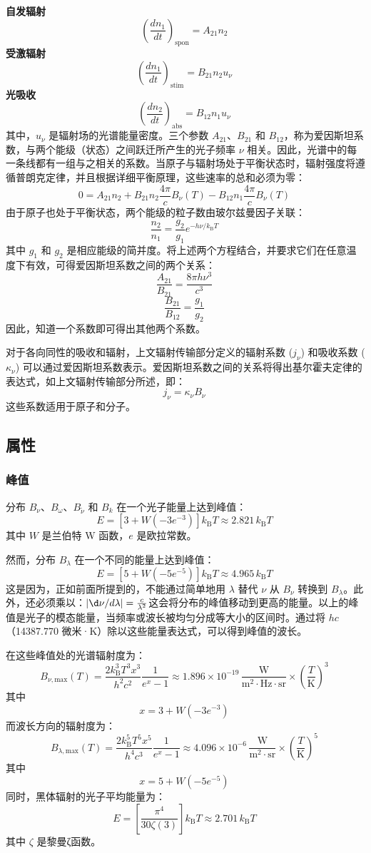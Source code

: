 \textbf{自发辐射}
\[
\left(\frac{dn_1}{dt}\right)_{\mathrm{spon}} = A_{21} n_2~
\]
\textbf{受激辐射}
\[
\left(\frac{dn_1}{dt}\right)_{\mathrm{stim}} = B_{21} n_2 u_\nu~
\]
\textbf{光吸收} 
\[
\left(\frac{dn_2}{dt}\right)_{\mathrm{abs}} = B_{12} n_1 u_\nu~
\]
其中，\( u_\nu \) 是辐射场的光谱能量密度。三个参数 \( A_{21} \)、\( B_{21} \) 和 \( B_{12} \)，称为爱因斯坦系数，与两个能级（状态）之间跃迁所产生的光子频率 \( \nu \) 相关。因此，光谱中的每一条线都有一组与之相关的系数。当原子与辐射场处于平衡状态时，辐射强度将遵循普朗克定律，并且根据详细平衡原理，这些速率的总和必须为零：
\[
0 = A_{21} n_2 + B_{21} n_2 \frac{4\pi}{c} B_\nu(T) - B_{12} n_1 \frac{4\pi}{c} B_\nu(T)~
\]
由于原子也处于平衡状态，两个能级的粒子数由玻尔兹曼因子关联：
\[
\frac{n_2}{n_1} = \frac{g_2}{g_1} e^{-h\nu / k_{\mathrm{B}} T}~
\]
其中 \( g_1 \) 和 \( g_2 \) 是相应能级的简并度。将上述两个方程结合，并要求它们在任意温度下有效，可得爱因斯坦系数之间的两个关系：
\[
\frac{A_{21}}{B_{21}} = \frac{8\pi h\nu^3}{c^3}~
\]
\[
\frac{B_{21}}{B_{12}} = \frac{g_1}{g_2}~
\]
因此，知道一个系数即可得出其他两个系数。

对于各向同性的吸收和辐射，上文辐射传输部分定义的辐射系数 (\( j_\nu \)) 和吸收系数 (\( \kappa_\nu \)) 可以通过爱因斯坦系数表示。爱因斯坦系数之间的关系将得出基尔霍夫定律的表达式，如上文辐射传输部分所述，即：
\[
j_\nu = \kappa_\nu B_\nu~
\]
这些系数适用于原子和分子。
\subsection{属性}
\subsubsection{峰值}
分布 \( B_\nu \)、\( B_\omega \)、\( B_{\tilde{\nu}} \) 和 \( B_k \) 在一个光子能量上达到峰值：
\[
E = \left[ 3 + W \left( -3e^{-3} \right) \right] k_{\mathrm{B}} T \approx 2.821 \, k_{\mathrm{B}} T~
\]
其中 \( W \) 是兰伯特 W 函数，\( e \) 是欧拉常数。

然而，分布 \( B_\lambda \) 在一个不同的能量上达到峰值：
\[
E = \left[ 5 + W \left( -5e^{-5} \right) \right] k_{\mathrm{B}} T \approx 4.965 \, k_{\mathrm{B}} T~
\]
这是因为，正如前面所提到的，不能通过简单地用 \( \lambda \) 替代 \( \nu \) 从 \( B_\nu \) 转换到 \( B_\lambda \)。此外，还必须乘以：\(| \d\nu/d\lambda| = \frac{c}{\lambda^2}\)这会将分布的峰值移动到更高的能量。以上的峰值是光子的模态能量，当频率或波长被均匀分成等大小的区间时。通过将 \( hc \)（14387.770 微米·K）除以这些能量表达式，可以得到峰值的波长。

在这些峰值处的光谱辐射度为：
\[
B_{\nu, {\text{max}}}(T) = \frac{2 k_{\mathrm{B}}^3 T^3 x^3}{h^2 c^2} \frac{1}{e^x - 1} \approx 1.896 \times 10^{-19} \, \frac{\text{W}}{\text{m}^2 \cdot \text{Hz} \cdot \text{sr}} \times \left( \frac{T}{\text{K}} \right)^3~
\]
其中
\[
x = 3 + W \left( -3e^{-3} \right)~
\]
而波长方向的辐射度为：
\[
B_{\lambda, {\text{max}}}(T) = \frac{2 k_{\mathrm{B}}^5 T^5 x^5}{h^4 c^3} \frac{1}{e^x - 1} \approx 4.096 \times 10^{-6} \, \frac{\text{W}}{\text{m}^2 \cdot \text{sr}} \times \left( \frac{T}{\text{K}} \right)^5~
\]
其中
\[
x = 5 + W \left( -5e^{-5} \right)~
\]
同时，黑体辐射的光子平均能量为：
\[
E = \left[ \frac{\pi^4}{30 \zeta(3)} \right] k_{\mathrm{B}} T \approx 2.701 \, k_{\mathrm{B}} T~
\]
其中 \( \zeta \) 是黎曼ζ函数。
